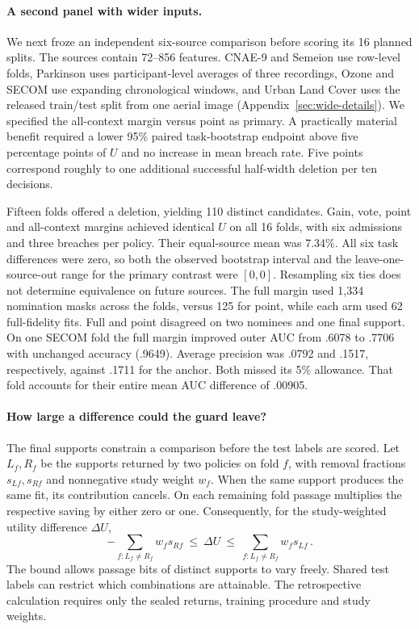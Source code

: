 \paragraph{A second panel with wider inputs.}
We next froze an independent six-source comparison before scoring its 16 planned splits. The sources contain 72--856 features. CNAE-9 and Semeion use row-level folds, Parkinson uses participant-level averages of three recordings, Ozone and SECOM use expanding chronological windows, and Urban Land Cover uses the released train/test split from one aerial image (Appendix~\ref{sec:wide-details}). We specified the all-context margin versus point as primary. A practically material benefit required a lower 95\% paired task-bootstrap endpoint above five percentage points of $U$ and no increase in mean breach rate. Five points correspond roughly to one additional successful half-width deletion per ten decisions.

Fifteen folds offered a deletion, yielding 110 distinct candidates. Gain, vote, point and all-context margins achieved identical $U$ on all 16 folds, with six admissions and three breaches per policy. Their equal-source mean was 7.34\%. All six task differences were zero, so both the observed bootstrap interval and the leave-one-source-out range for the primary contrast were $[0,0]$. Resampling six ties does not determine equivalence on future sources. The full margin used 1,334 nomination masks across the folds, versus 125 for point, while each arm used 62 full-fidelity fits. Full and point disagreed on two nominees and one final support. On one SECOM fold the full margin improved outer AUC from .6078 to .7706 with unchanged accuracy (.9649). Average precision was .0792 and .1517, respectively, against .1711 for the anchor. Both missed its 5\% allowance. That fold accounts for their entire mean AUC difference of .00905.

\paragraph{How large a difference could the guard leave?}
The final supports constrain a comparison before the test labels are scored. Let $L_f,R_f$ be the supports returned by two policies on fold $f$, with removal fractions $s_{Lf},s_{Rf}$ and nonnegative study weight $w_f$. When the same support produces the same fit, its contribution cancels. On each remaining fold passage multiplies the respective saving by either zero or one. Consequently, for the study-weighted utility difference $\Delta U$,
\begin{equation}
 -\sum_{f:L_f\ne R_f}w_f s_{Rf}\ \leq\ \Delta U\ \leq\
 \sum_{f:L_f\ne R_f}w_f s_{Lf}\,.
 \label{eq:opportunity-bound}
\end{equation}
The bound allows passage bits of distinct supports to vary freely. Shared test labels can restrict which combinations are attainable. The retrospective calculation requires only the sealed returns, training procedure and study weights.

